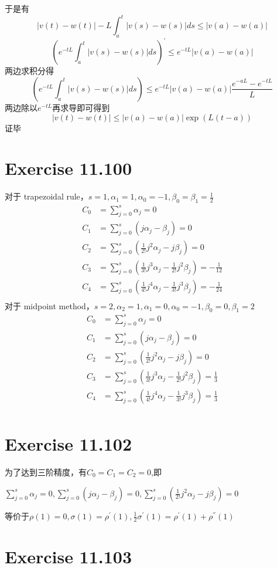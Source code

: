 \documentclass[twoside,a4paper]{article}
\begin{document}
于是有
$$
|v(t) - w(t)| -L\int_a^t |v(s) - w(s)|ds \leq |v(a) - w(a)|
$$
$$
(e^{-tL}\int_a^t |v(s) - w(s)|ds)^{'} \leq e^{-tL}|v(a) - w(a)|
$$
两边求积分得
$$
(e^{-tL}\int_a^t |v(s) - w(s)|ds) \leq e^{-tL}|v(a) - w(a)|\frac{e^{-aL}-e^{-tL}}{L}
$$
两边除以$e^{-tL}$再求导即可得到
$$|v(t) - w(t)| \leq |v(a) - w(a)|\exp(L(t-a))$$ 证毕


\section{Exercise 11.100}

对于 trapezoidal rule，$s=1,\alpha_1=1,\alpha_0=-1,\beta_0=\beta_1=\frac{1}{2}$
$$\begin{aligned}
  C_0&=\sum_{j=0}^s\alpha_j=0\\
  C_1&=\sum_{j=0}^s(j\alpha_j-\beta_j)=0\\
  C_2&=\sum_{j=0}^s(\frac{1}{2!}j^2\alpha_j-j\beta_j)=0\\
  C_3&=\sum_{j=0}^s(\frac{1}{3!}j^3\alpha_j-\frac{1}{2!}j^2\beta_j)=-\frac{1}{12}\\
  C_4&=\sum_{j=0}^s(\frac{1}{4!}j^4\alpha_j-\frac{1}{3!}j^3\beta_j)=-\frac{1}{24}\\
  \end{aligned}$$
  对于 midpoint method，$s=2,\alpha_2=1,\alpha_1=0,\alpha_0=-1,\beta_0=0,\beta_1=2$
  $$\begin{aligned}
    C_0&=\sum_{j=0}^s\alpha_j=0\\
    C_1&=\sum_{j=0}^s(j\alpha_j-\beta_j)=0\\
    C_2&=\sum_{j=0}^s(\frac{1}{2!}j^2\alpha_j-j\beta_j)=0\\
    C_3&=\sum_{j=0}^s(\frac{1}{3!}j^3\alpha_j-\frac{1}{2!}j^2\beta_j)=\frac{1}{3}\\
    C_4&=\sum_{j=0}^s(\frac{1}{4!}j^4\alpha_j-\frac{1}{3!}j^3\beta_j)=\frac{1}{3}\\
    \end{aligned}$$
    
\section{Exercise 11.102}
    为了达到三阶精度，有$C_0=C_1=C_2=0$,即

    $\sum_{j=0}^s\alpha_j=0,\sum_{j=0}^s(j\alpha_j-\beta_j)=0,\sum_{j=0}^s(\frac{1}{2!}j^2\alpha_j-j\beta_j)=0$

    等价于$\rho(1)=0,\sigma(1)=\rho^{'}(1),\frac{1}{2}\sigma^{'}(1)=\rho^{'}(1)+\rho^{''}(1)$

\section{Exercise 11.103}
\end{document}
